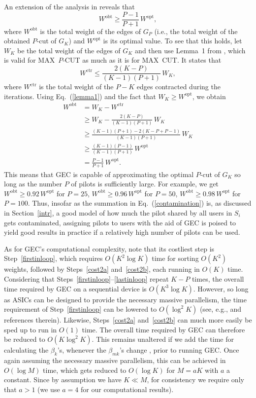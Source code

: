 \documentclass[]{IEEEtran}
\begin{document}
An extension of the analysis in \cite{kkbh08} reveals that
\begin{equation}
W^\mathrm{obt}\ge\frac{P-1}{P+1}\,W^\mathrm{opt},
\end{equation}
where $W^\mathrm{obt}$ is the total weight of the edges of $G_P$ (i.e., the
total weight of the obtained $P$-cut of $G_K$) and $W^\mathrm{opt}$ is its
optimal value. To see that this holds, let $W_K$ be the total weight of the
edges of $G_K$ and then use Lemma~1 from \cite{kkbh08}, which is valid for
MAX~$P$-CUT as much as it is for MAX~CUT. It states that
\begin{equation}
W^\mathrm{ctr}\le\frac{2(K-P)}{(K-1)(P+1)}\,W_K,
\label{lemma1}
\end{equation}
where $W^\mathrm{ctr}$ is the total weight of the $P-K$ edges contracted during
the iterations. Using Eq.~(\ref{lemma1}) and the fact that
$W_K\ge W^\mathrm{opt}$, we obtain
\begin{align}
W^\mathrm{obt} &= W_K-W^\mathrm{ctr} \\
&\ge W_K-\frac{2(K-P)}{(K-1)(P+1)}\,W_K \\
&\ge \frac{(K-1)(P+1)-2(K-P+P-1)}{(K-1)(P+1)}\,W_K \\
&\ge \frac{(K-1)(P-1)}{(K-1)(P+1)}\,W^\mathrm{opt} \\
&= \frac{P-1}{P+1}\,W^\mathrm{opt}. 
\end{align}
This means that GEC is capable of approximating the optimal $P$-cut of $G_K$ so
long as the number $P$ of pilots is sufficiently large. For example, we get
$W^\mathrm{obt}\ge 0.92\,W^\mathrm{opt}$ for $P=25$,
$W^\mathrm{obt}\ge 0.96\,W^\mathrm{opt}$ for $P=50$,
$W^\mathrm{obt}\ge 0.98\,W^\mathrm{opt}$ for $P=100$. Thus, insofar as the
summation in Eq.~(\ref{contamination}) is, as discussed in Section~\ref{intr},
a good model of how much the pilot shared by all users in $S_i$ gets
contaminated, assigning pilots to users with the aid of GEC is poised to yield
good results in practice if a relatively high number of pilots can be used.

As for GEC's computational complexity, note that its costliest step is
Step~\ref{firstinloop}, which requires $O(K^2\log K)$ time for sorting $O(K^2)$
weights, followed by Steps~\ref{cost2a} and~\ref{cost2b}, each running in $O(K)$
time. Considering that Steps~\ref{firstinloop}--\ref{lastinloop} repeat
$K-P$ times, the overall time required by GEC on a sequential
device is $O(K^3\log K)$. However, so long as ASICs can be designed
to provide the necessary massive parallelism, the time requirement of
Step~\ref{firstinloop} can be lowered to $O(\log^2K)$ (see, e.g., \cite{abss15}
and references therein). Likewise, Steps~\ref{cost2a} and~\ref{cost2b} can much
more easily be sped up to run in $O(1)$ time. The overall time required by GEC
can therefore be reduced to $O(K\log^2K)$. This remains unaltered if we add the
time for calculating the $\beta_k$'s, whenever the $\beta_{mk}$'s change , prior
to running GEC. Once again assuming the necessary massive parallelism, this can
be achieved in $O(\log M)$ time, which gets reduced to $O(\log K)$ for $M=aK$
with $a$ a constant. Since by assumption we have $K\ll M$, for consistency we
require only that $a>1$ (we use $a=4$ for our computational results).
\end{document}
